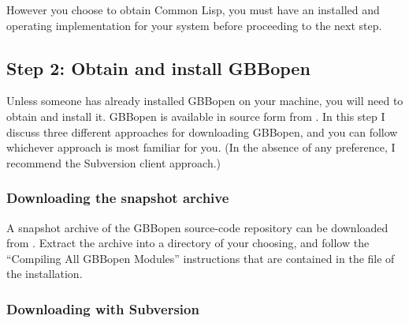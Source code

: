 \documentclass[10pt,twoside,english,pdftex]{article}
\begin{document}

However you choose to obtain Common Lisp, you must have an installed and
operating implementation for your system before proceeding to the next step.

\subsection*{Step 2: Obtain and install GBBopen}

%
%
Unless someone has already installed GBBopen on your machine, you will need to
obtain and install it.  GBBopen is available in source form from
. In this
step I discuss three different approaches for downloading GBBopen, and you can
follow whichever approach is most familiar for you.  (In the absence of any
preference, I recommend the Subversion client approach.)

\subsubsection*{Downloading the snapshot archive}

A snapshot archive of the GBBopen source-code repository can be downloaded
from
.
Extract the archive into a directory of your choosing, and follow the
``Compiling All GBBopen Modules'' instructions that are contained in the
 file of the installation.

\subsubsection*{Downloading with Subversion}
\end{document}

